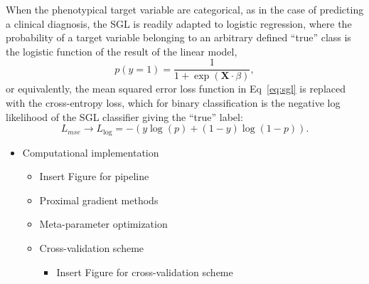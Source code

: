 When the phenotypical target variable are categorical, as in the case of predicting a clinical diagnosis, the SGL is readily adapted to logistic regression, where the probability of a target variable belonging to an arbitrary defined ``true'' class is the logistic function of the result of the linear model,
\begin{equation}
    p(y = 1) = \frac{1}{1 + \exp(\mathbf{X}\cdot \beta)},
    \label{eq:logit}
\end{equation}
or equivalently, the mean squared error loss function in Eq~\eqref{eq:sgl} is replaced with the cross-entropy loss, which for binary classification is the negative log likelihood of the SGL classifier giving the ``true'' label:
\begin{equation}
    L_{mse} \rightarrow L_{\log} = -\left(y \log(p) + (1 - y) \log(1 - p)\right).
    \label{eq:logloss}
\end{equation}

\begin{itemize}
  \item Computational implementation
    \begin{itemize}
      \item Insert Figure for pipeline
      \item Proximal gradient methods
      \item Meta-parameter optimization
      \item Cross-validation scheme
        \begin{itemize}
          \item Insert Figure for cross-validation scheme
        \end{itemize}
    \end{itemize}
\end{itemize}
